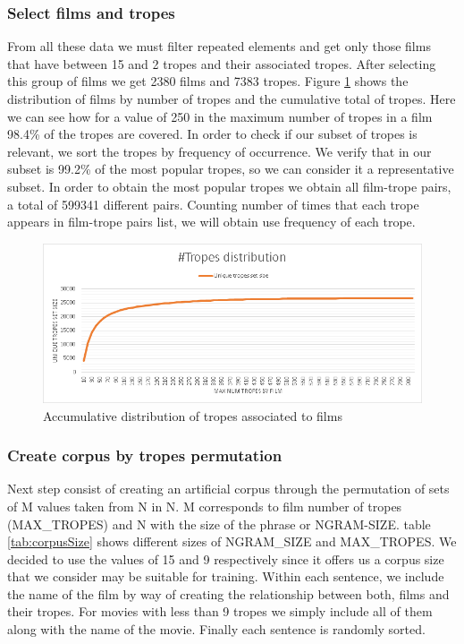 \documentclass[letterpaper]{article}
\begin{document}
	\subsubsection{Select films and tropes}
	From all these data we must filter repeated elements and get only those films that have between 15 and 2 tropes and their associated tropes. After selecting this group of films we get 2380 films and 7383 tropes.
	Figure \ref{fig:tropesdistributionasociatedtofilms} shows the distribution of films by number of tropes and the cumulative total of tropes. Here we can see how for a value of 250 in the maximum number of tropes in a film 98.4\% of the tropes are covered. In order to check if our subset of tropes is relevant, we sort the tropes by frequency of occurrence. We verify that in our subset is 99.2\% of the most popular tropes, so we can consider it a representative subset. In order to obtain the most popular tropes we obtain all  film-trope pairs, a total of 599341 different pairs. Counting number of times that each trope appears in film-trope pairs list, we will obtain use frequency of each trope. 
	
	\begin{figure}
		\centering
		\includegraphics[width=1\linewidth]{../images/tropes_distribution_chart.png}
		\caption{Accumulative distribution of tropes associated to films}
		\label{fig:tropesdistributionasociatedtofilms}
	\end{figure}
	
	\subsubsection{Create corpus by tropes permutation}
	Next step consist of creating an artificial corpus through the permutation of sets of M values taken from N in N. M corresponds to film number of tropes  (MAX\_TROPES) and N with the size of the phrase or NGRAM-SIZE. table \ref{tab:corpusSize} shows different sizes of NGRAM\_SIZE and MAX\_TROPES. We decided to use the values of 15 and 9 respectively since it offers us a corpus size that we consider may be suitable for training. Within each sentence, we include the name of the film by way of creating the relationship between both, films and their tropes. 
	For movies with less than 9 tropes we simply include all of them along with the name of the movie. Finally each sentence is randomly sorted.
	
\end{document}
